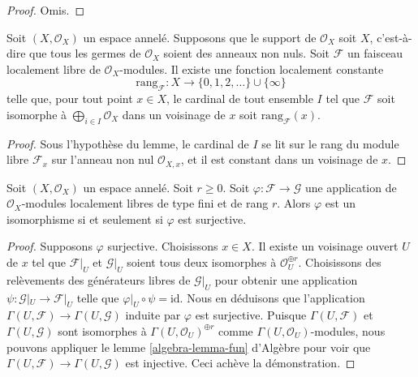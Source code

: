 \begin{proof}
Omis.
\end{proof}

\begin{lemma}
\label{lemma-rank}
Soit $(X, \mathcal{O}_X)$ un espace annelé.
Supposons que le support de $\mathcal{O}_X$ soit $X$,
c'est-à-dire que tous les germes de $\mathcal{O}_X$ soient des anneaux non nuls.
Soit $\mathcal{F}$ un faisceau localement libre de $\mathcal{O}_X$-modules.
Il existe une fonction localement constante
$$
\text{rang}_\mathcal{F} :
X \longrightarrow \{0, 1, 2, \ldots\}\cup\{\infty\}
$$
telle que, pour tout point $x \in X$, le cardinal de tout
ensemble $I$ tel que $\mathcal{F}$ soit isomorphe à
$\bigoplus_{i\in I} \mathcal{O}_X$ dans un voisinage
de $x$ soit $\text{rang}_\mathcal{F}(x)$.
\end{lemma}

\begin{proof}
Sous l'hypothèse du lemme, le cardinal de $I$ se lit
sur le rang du module libre $\mathcal{F}_x$ sur l'anneau non nul
$\mathcal{O}_{X, x}$, et il est constant dans un voisinage de $x$.
\end{proof}

\begin{lemma}
\label{lemma-map-finite-locally-free}
Soit $(X, \mathcal{O}_X)$ un espace annelé. Soit $r \geq 0$.
Soit $\varphi : \mathcal{F} \to \mathcal{G}$ une application de
$\mathcal{O}_X$-modules localement libres de type fini et de rang $r$.
Alors $\varphi$ est un isomorphisme si et seulement si $\varphi$
est surjective.
\end{lemma}

\begin{proof}
Supposons $\varphi$ surjective. Choisissons $x \in X$.
Il existe un voisinage ouvert $U$ de $x$
tel que $\mathcal{F}|_U$ et $\mathcal{G}|_U$ soient tous deux
isomorphes à $\mathcal{O}_U^{\oplus r}$.
Choisissons des relèvements des générateurs libres de $\mathcal{G}|_U$
pour obtenir une application $\psi : \mathcal{G}|_U \to \mathcal{F}|_U$
telle que $\varphi|_U \circ \psi = \text{id}$.
Nous en déduisons que l'application
$\Gamma(U, \mathcal{F}) \to \Gamma(U, \mathcal{G})$
induite par $\varphi$ est surjective. Puisque
$\Gamma(U, \mathcal{F})$ et $\Gamma(U, \mathcal{G})$
sont isomorphes à $\Gamma(U, \mathcal{O}_U)^{\oplus r}$
comme $\Gamma(U, \mathcal{O}_U)$-modules, nous pouvons
appliquer le lemme \ref{algebra-lemma-fun} d'Algèbre pour voir que
$\Gamma(U, \mathcal{F}) \to \Gamma(U, \mathcal{G})$
est injective. Ceci achève la démonstration.
\end{proof}


